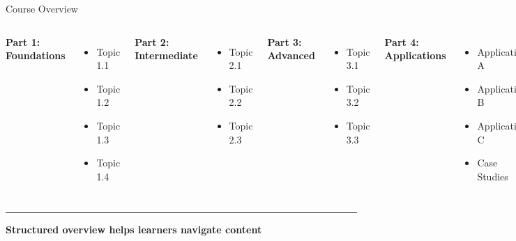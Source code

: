 \documentclass[8pt,aspectratio=169]{beamer}
\newcommand{\bottomnote}[1]{%
\vfill
\vspace{-2mm}
\textcolor{mllavender2}{\rule{\textwidth}{0.4pt}}
\vspace{1mm}
\footnotesize
\textbf{#1}
}
\begin{document}
\begin{frame}[t]{Course Overview}
\begin{columns}[T]
\textbf{Part 1: Foundations}
\begin{itemize}
\item Topic 1.1
\item Topic 1.2
\item Topic 1.3
\item Topic 1.4
\end{itemize}

\vspace{0.5em}
\textbf{Part 2: Intermediate}
\begin{itemize}
\item Topic 2.1
\item Topic 2.2
\item Topic 2.3
\end{itemize}

\textbf{Part 3: Advanced}
\begin{itemize}
\item Topic 3.1
\item Topic 3.2
\item Topic 3.3
\end{itemize}

\vspace{0.5em}
\textbf{Part 4: Applications}
\begin{itemize}
\item Application A
\item Application B
\item Application C
\item Case Studies
\end{itemize}
\end{columns}

\vspace{0.5em}
\begin{center}
\framebox[0.8\textwidth][c]{
\vspace{1.5cm}
\textcolor{midgray}{[Course Roadmap/Flow Diagram]}
\vspace{1.5cm}
}
\end{center}

\bottomnote{Structured overview helps learners navigate content}
\end{frame}
\end{document}
